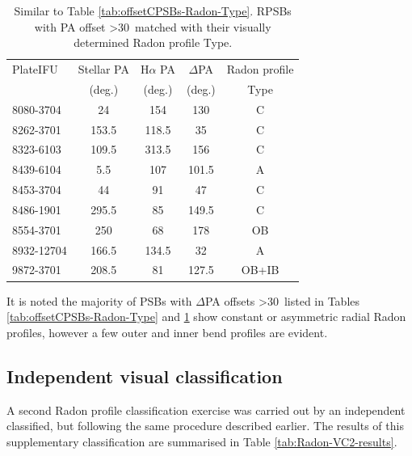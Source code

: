 \begin{table}
\centering
\caption[RPSBs with PA offset \textgreater 30\textdegree\ matched with their visually determined Radon profile Type]{Similar to Table \ref{tab:offsetCPSBs-Radon-Type}. RPSBs with PA offset \textgreater 30\textdegree\ matched with their visually determined Radon profile Type.}
\label{tab:offsetRPSBs-Radon-Type}
\begin{tabular}{lcccc}
\hline
PlateIFU   & Stellar PA & H$\alpha$ PA & $\Delta$PA & Radon profile \\
  & (deg.) & (deg.) & (deg.) & Type\\
\hline
8080-3704 & 24 & 154 & 130 & C \\
8262-3701 & 153.5 & 118.5 & 35 & C \\
8323-6103 & 109.5 & 313.5 & 156 & C \\
8439-6104 & 5.5 & 107 & 101.5 & A \\
8453-3704 & 44 & 91 & 47 & C \\
8486-1901 & 295.5 & 85 & 149.5 & C \\
8554-3701 & 250 & 68 & 178 & OB \\
8932-12704 & 166.5 & 134.5 & 32 & A \\
9872-3701 & 208.5 & 81 & 127.5 & OB+IB \\
\hline
\end{tabular}
\end{table}

It is noted the majority of PSBs with $\Delta$PA offsets \textgreater 30\textdegree\ listed in Tables \ref{tab:offsetCPSBs-Radon-Type} and \ref{tab:offsetRPSBs-Radon-Type} show constant or asymmetric radial Radon profiles, however a few outer and inner bend profiles are evident. 

\subsection{Independent visual classification}
\label{independent-classification}
A second Radon profile classification exercise was carried out by an independent classified, but following the same procedure described earlier. The results of this supplementary classification are summarised in Table \ref{tab:Radon-VC2-results}.


